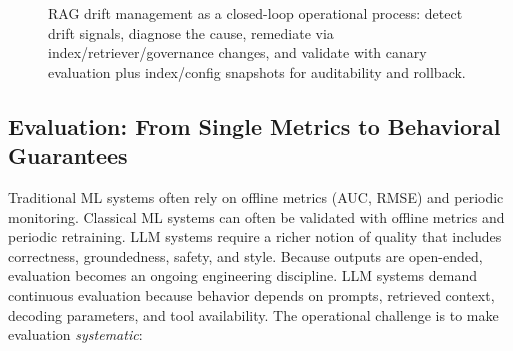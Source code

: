\begin{figure}[t]
\begin{llmfigbox}
  \end{llmfigbox}
  \caption{RAG drift management as a closed-loop operational process: detect drift signals, diagnose the cause, remediate via index/retriever/governance changes, and validate with canary evaluation plus index/config snapshots for auditability and rollback.}
  \label{fig:ch01_rag_drift_control}
\end{figure}

\subsection{Evaluation: From Single Metrics to Behavioral Guarantees}
Traditional ML systems often rely on offline metrics (AUC, RMSE) and periodic monitoring. Classical ML systems can often be validated with offline metrics and periodic retraining. LLM systems require a richer notion of quality that includes correctness, groundedness, safety, and style. Because outputs are open-ended, evaluation becomes an ongoing engineering discipline. LLM systems demand continuous evaluation because behavior depends on prompts, retrieved context, decoding parameters, and tool availability. The operational challenge is to make evaluation \emph{systematic}:

